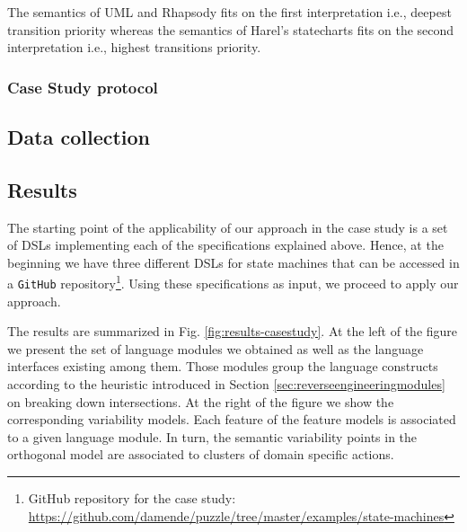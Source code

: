 The semantics of UML and Rhapsody fits on the first interpretation i.e., deepest transition priority whereas the semantics of Harel's statecharts fits on the second interpretation i.e., highest transitions priority.

\subsubsection{Case Study protocol}

\subsection{Data collection}



\subsection{Results}

The starting point of the applicability of our approach in the case study is a set of DSLs implementing each of the specifications explained above. Hence, at the beginning we have three different DSLs for state machines that can be accessed in a \texttt{GitHub} repository\footnote{GitHub repository for the case study: \url{https://github.com/damende/puzzle/tree/master/examples/state-machines}}. Using these specifications as input, we proceed to apply our approach.

The results are summarized in Fig. \ref{fig:results-casestudy}. At the left of the figure we present the set of language modules we obtained as well as the language interfaces existing among them. Those modules group the language constructs according to the heuristic introduced in Section \ref{sec:reverseengineeringmodules} on breaking down intersections. At the right of the figure we show the corresponding variability models. Each feature of the feature models is associated to a given language module. In turn, the semantic variability points in the orthogonal model are associated to clusters of domain specific actions.

